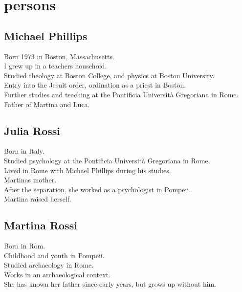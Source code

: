 \documentclass[
]{article}
\begin{document}
\section{persons}\label{persons}

\subsection{Michael Phillips}\label{michael-phillips}

Born 1973 in Boston, Massachusetts.\\
I grew up in a teacher\textquotesingle s household.\\
Studied theology at Boston College, and physics at Boston University.\\
Entry into the Jesuit order, ordination as a priest in Boston.\\
Further studies and teaching at the Pontificia Università Gregoriana in Rome.\\
Father of Martina and Luca.

\subsection{Julia Rossi}\label{julia-rossi}

Born in Italy.\\
Studied psychology at the Pontificia Università Gregoriana in Rome.\\
Lived in Rome with Michael Phillips during his studies.\\
Martina\textquotesingle s mother.\\
After the separation, she worked as a psychologist in Pompeii.\\
Martina raised herself.

\subsection{Martina Rossi}\label{martina-rossi}

Born in Rom.\\
Childhood and youth in Pompeii.\\
Studied archaeology in Rome.\\
Works in an archaeological context.\\
She has known her father since early years, but grows up without him.

\subsubsection{\texorpdfstring{\hfill\break
}{ }}\label{section}
\end{document}
